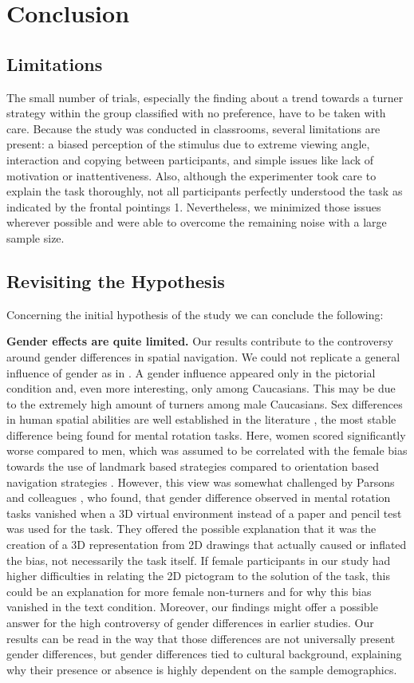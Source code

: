 \documentclass{frontiersSCNS} %
\begin{document}
\section{Conclusion}
\subsection{Limitations}
The small number of trials, especially the finding about a trend towards a turner strategy within the group classified with no preference, have to be taken with care. Because the study was conducted in classrooms, several limitations are present: a biased perception of the stimulus due to extreme viewing angle, interaction and copying between participants, and simple issues like lack of motivation or inattentiveness. Also, although the experimenter took care to explain the task thoroughly, not all participants perfectly understood the task as indicated by the frontal pointings 1. Nevertheless, we minimized those issues wherever possible and were able to overcome the remaining noise with a large sample size.

\subsection{Revisiting the Hypothesis}
Concerning the initial hypothesis of the study we can conclude the following:

\textbf{Gender effects are quite limited.}
Our results contribute to the controversy around gender differences in spatial navigation. We could not replicate a general influence of gender as in \citep{Goeke2013}. A gender influence appeared only in the pictorial condition and, even more interesting, only among Caucasians. This may be due to the extremely high amount of turners among male Caucasians.
Sex differences in human spatial abilities are well established in the literature \citep{Linn1985,Voyer1995}, the most stable difference being found for mental rotation tasks. Here, women scored significantly worse compared to men, which was assumed to be correlated with the female bias towards the use of landmark based strategies compared to orientation based navigation strategies \citep{Moffat1998,Dabbs1998,Astur1998}. However, this view was somewhat challenged by Parsons and colleagues \citep{Parsons2004}, who found, that gender difference observed in mental rotation tasks vanished when a 3D virtual environment instead of a paper and pencil test was used for the task. They offered the possible explanation that it was the creation of a 3D representation from 2D drawings that actually caused or inflated the bias, not necessarily the task itself. If female participants in our study had higher difficulties in relating the 2D pictogram to the solution of the task, this could be an explanation for more female non-turners and for why this bias vanished in the text condition. Moreover, our findings might offer a possible answer for the high controversy of gender differences in earlier studies. Our results can be read in the way that those differences are not universally present gender differences, but gender differences tied to cultural background, explaining why their presence or absence is highly dependent on the sample demographics.
\end{document}

